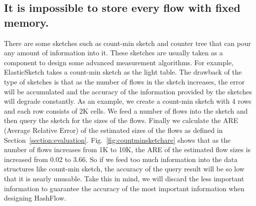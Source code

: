 \iffalse
\subsection{It is impossible to store every flow with fixed memory.}
There are some sketches such as count-min sketch\cite{cormode_countmin_2005} and counter tree\cite{chen_counter_2017} that can pour any amount of information into it. These sketches are usually taken as a component to design some advanced measurement algorithms. For example, ElasticSketch\cite{yang_elastic_2018} takes a count-min sketch as the light table. The drawback of the type of sketches is that as the number of flows in the sketch increases, the error will be accumulated and the accuracy of the information provided by the sketches will degrade constantly. As an example, we create a count-min sketch with 4 rows and each row consists of 2K cells. We feed a number of flows into the sketch and then query the sketch for the sizes of the flows. Finally we calculate the ARE (Average Relative Error) of the estimated sizes of the flows as defined in Section~\ref{section:evaluation}. Fig.~\ref{fig:countminsketchare} shows that as the number of flows increases from 1K to 10K, the ARE of the estimated flow sizes is increased from 0.02 to 3.66. So if we feed too much information into the data structures like count-min sketch, the accuracy of the query result will be so low that it is nearly unusable. Take this in mind, we will discard the less important information to guarantee the accuracy of the most important information when designing HashFlow.

